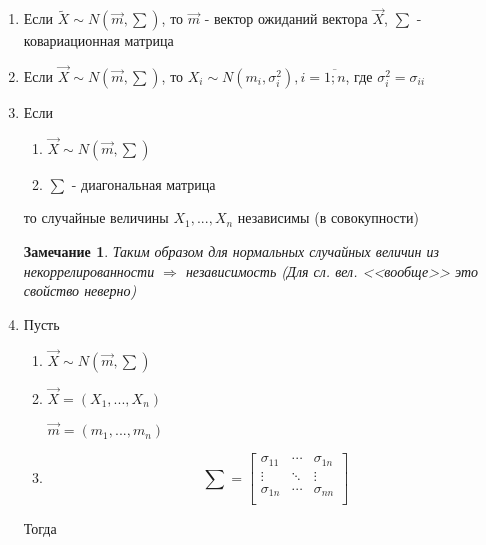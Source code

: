\documentclass[a4paper, 14pt]{report}
\newtheorem{note}{Замечание}[section]
\begin{document}
\begin{enumerate}
    \item Если $\tilde X \sim N(\vec m, \sum)$, то $\vec m$ - вектор ожиданий вектора $\vec X$, $\sum$ - ковариационная матрица

    \item Если $\vec X \sim N(\vec m, \sum)$, то $X_i \sim N(m_i, \sigma_i^2), i = \overline{1;n}$, где $\sigma_i^2 = \sigma_{ii}$

    \item Если

        \begin{enumerate}
            \item $\vec X \sim N(\vec m, \sum)$
            \item $\sum$ - диагональная матрица
        \end{enumerate}

        то случайные величины $X_1, ..., X_n$ независимы (в совокупности)

        \begin{note}
            Таким образом для нормальных случайных величин из некоррелированности $\Rightarrow$ независимость (Для сл. вел. <<вообще>> это свойство неверно)
        \end{note}

    \item Пусть

        \begin{enumerate}
            \item $\vec X \sim N(\vec m, \sum)$
            \item $\vec X = (X_1, ..., X_n)$

                $\vec m = (m_1,..., m_n)$

            \item

                $$
                \sum =
                \left[
                    \begin{matrix}
                        \sigma_{11} & \cdots & \sigma_{1n} \\
                        \vdots & \ddots & \vdots \\
                        \sigma_{1n} & \cdots & \sigma_{nn} \\
                    \end{matrix}
                \right]
                $$
        \end{enumerate}

        Тогда


\end{enumerate}
\end{document}
